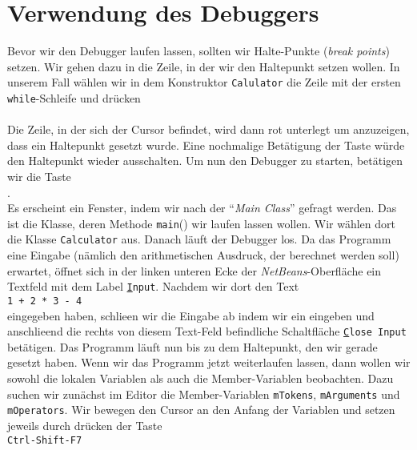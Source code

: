 \documentclass{article}
\begin{document}
\section{Verwendung des Debuggers}
Bevor wir den Debugger laufen lassen, sollten wir Halte-Punkte (\emph{break points})
setzen.  Wir gehen dazu in die Zeile, in der wir den Haltepunkt setzen wollen.
In unserem Fall w\"ahlen wir in dem Konstruktor \texttt{Calulator} die Zeile mit der ersten
\texttt{while}-Schleife  und dr\"ucken 
\\[0.1cm]
\hspace*{1.3cm}  \\[0.1cm]
Die Zeile, in der sich der Cursor befindet, wird dann rot unterlegt um anzuzeigen, dass
ein Haltepunkt gesetzt wurde.  Eine nochmalige Bet\"atigung der Taste
w\"urde den Haltepunkt wieder ausschalten.  Um nun den Debugger zu starten, bet\"atigen wir
die Taste \\[0.1cm]
\hspace*{1.3cm} . \\[0.1cm]
Es erscheint ein Fenster, indem wir nach der ``\emph{Main Class}'' gefragt werden.  
Das ist die Klasse, deren Methode \texttt{main}() wir laufen lassen wollen.
Wir w\"ahlen dort die Klasse \texttt{Calculator} aus.  Danach l\"auft der Debugger los.  Da das
Programm eine Eingabe (n\"amlich den arithmetischen Ausdruck, der berechnet werden soll)
erwartet, \"offnet sich in der linken unteren Ecke der \textsl{NetBeans}-Oberfl\"ache ein
Textfeld mit dem Label \texttt{\underline{I}nput}.  Nachdem wir dort den Text \\[0.1cm]
\hspace*{1.3cm} \texttt{1 + 2 * 3 - 4} \\[0.1cm]
eingegeben haben, schlie\3en wir die Eingabe ab indem wir ein  eingeben 
und anschlie\3end  die rechts von diesem Text-Feld befindliche Schaltfl\"ache
\texttt{\underline{C}lose Input} bet\"atigen.   Das Programm l\"auft nun bis zu dem
Haltepunkt, den wir gerade gesetzt haben.
Wenn wir das Programm jetzt weiterlaufen lassen, dann  wollen wir sowohl die lokalen
Variablen als auch die Member-Variablen beobachten.  Dazu suchen wir zun\"achst im Editor die
Member-Variablen \texttt{mTokens}, \texttt{mArguments} und \texttt{mOperators}.  Wir
bewegen den Cursor an den Anfang der Variablen und setzen jeweils durch
dr\"ucken der Taste \\[0.1cm]
\hspace*{1.3cm} \texttt{Ctrl-Shift-F7} \\[0.1cm]
\end{document}
